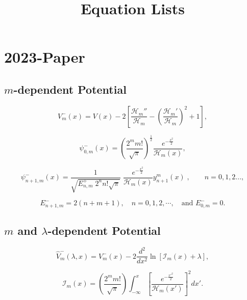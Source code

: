 \documentclass[12pt]{article}
\title{Equation Lists}
\author{}
\date{}
\begin{document}
\newcommand{\be}{\begin{equation}}
\newcommand{\ba}{\begin{eqnarray}}
\newcommand{\ee}{\end{equation}}

\section*{2023-Paper}
\subsection*{$m$-dependent Potential}
\begin{equation}
V^-_m(x)=V(x)-2\left[ \frac{\mathcal{H}_m''}{\mathcal{H}_m}-\left(\frac{\mathcal{H}_m'}{\mathcal{H}_m}\right)^2+1\right],
\end{equation} 

\begin{equation}
\psi^-_{0,m}(x)=\left( \frac{2^m m!}{\sqrt{\pi}}\right)^{ \frac{1}{2}}  \frac{e^{- \frac{x^2}{2}}}{\mathcal{H}_m(x)}, \label{RE-GS}
\end{equation} 

\begin{equation}
\psi^-_{n+1,m}(x)=\frac{1}{\sqrt{E^+_{n,m}\;2^{n}n!\sqrt{\pi}}}\;\frac{e^{- \frac{x^2}{2}}}{\mathcal{H}_m(x)} y^m_{n+1}(x) \;,\qquad n=0,1,2...,	
\end{equation}

\begin{equation}\label{1}
 E^-_{n+1,m}=2(n+m+1),\quad n=0,1,2,\cdots,\quad \text{and } E^-_{0,m}=0. 
\end{equation} 

\subsection*{$m$ and $\lambda$-dependent Potential}



\begin{equation}
\hat{V}^-_m(\lambda,x)=V^-_m(x)-2 \frac{d^2}{dx^2}\ln\left[\mathcal{I}_m(x)+\lambda\right],\label{ISO-V}
\end{equation}

\begin{equation}
 \mathcal{I}_m(x)= \left( \frac{2^m m!}{\sqrt{\pi}}\right)\int^x_{-\infty} \left[ \frac{e^{- \frac{{x'}^2}{2}}}{\mathcal{H}_m(x')}\right]^2 dx'\label{I}.
\end{equation}\\
\end{document}

